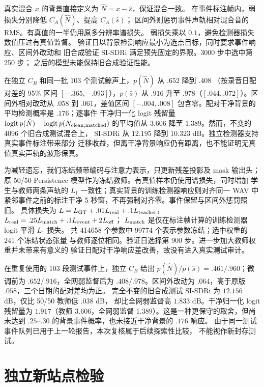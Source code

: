 \documentclass[conference]{IEEEtran}
\begin{document}
真实混合 $x$ 的背景直接定义为 $\hat N=x-\hat s$，保证混合一致。
在事件标注帧内，弱损失分别降低 $C_A(\hat N)$、提高 $C_A(\hat s)$；
区间外则惩罚事件声轨相对混合音的 RMS。有真值的一半仍用原多分辨率谱损失。
弱损失乘以 $0.1$，避免检测器损失数值压过有真值监督。
验证日以背景检测响应最小为选点目标，同时要求事件响应、区间外改动和
旧合成验证 SI-SDRi 满足预先固定的界限。3000 步中选中第 250 步；
之后的模型未能保持旧合成验证性能。

在独立 $C_B$ 和同一批 103 个测试鲸声上，$p(\hat N)$ 从 $.652$ 降到 $.408$
（按录音日配对差的 95\% 区间 $[-.365,-.093]$），$p(\hat s)$ 从 $.916$ 升至
$.978$（$[.044,.072]$）。区间外相对改动从 $.058$ 到 $.061$，差值区间
$[-.004,.008]$ 包含零。配对干净背景的平均检测概率是 $.176$；逐事件
干净归一化 logit 残留量
$\operatorname{logit}p(\hat N)-\operatorname{logit}p(N_{\rm clean,matched})$
的平均值从 $3.606$ 降至 $1.389$。然而，不变的 4096 个旧合成测试混合上，
SI-SDRi 从 $12.195$ 降到 $10.323$ dB。独立检测器支持真实事件标注带来部分
迁移收益，但离干净背景响应仍有距离，也不能证明无真值真实声轨的波形保真。

为减轻遗忘，我们冻结频带编码与注意力表示，只更新残差投影及 mask 输出头；
原 50/50 Persistence 模型作为冻结教师。有真值样本仍使用谱损失，同时增加
学生与教师两条声轨的 $L_1$ 一致性；真实背景的训练检测器响应则对齐同一 WAV
中紧邻事件之前的标注干净 5 秒窗，不再强制对齐零。事件保留与区间外惩罚照旧。
具体损失为 $L=L_{\rm GT}+.01L_{\rm real}+.1L_{\rm teacher}$，
$L_{\rm real}=.25L_{\rm match}+.1L_{\rm event}+2L_{\rm off}$；
$L_{\rm match}$ 是仅在标注帧计算的训练检测器 logit 平滑 $L_1$ 损失。
共 414658 个参数中 99774 个表示参数冻结；选中权重的 241 个冻结状态张量
与教师逐位相同。验证日选择第 900 步。进一步加大教师权重并未带来有意义的
验证日配对干净响应差改善，故没有进入真实测试审计。

在重复使用的 103 段测试事件上，独立 $C_B$ 给出
$p(\hat N)/p(\hat s)=.461/.960$；微调前为 $.652/.916$，全网弱监督后为
$.408/.978$。区间外改动为 $.064$，高于原版 $.058$，三个日期的配对差均为正。
完全不变的旧合成测试 SI-SDRi 为 $12.156$ dB，仅比 50/50 教师低 $.038$ dB，
却比全网弱监督高 $1.833$ dB。干净归一化 logit 残留量为 $1.917$（教师
$3.606$，全网弱监督 $1.389$）。这是一种更保守的取舍，但尚未达到
$.25$--$.30$ 的背景事件概率，也未接近干净背景的 $.176$ 响应。
由于同一测试事件队列已用于上一轮报告，本次复核属于后续探索性比较，
不能视作新封存测试。

\section{独立新站点检验}\label{sec:holdout}
\end{document}
